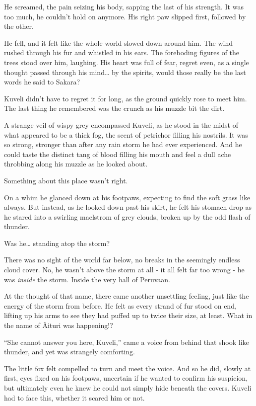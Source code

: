 He screamed, the pain seizing his body, sapping the last of his strength. It was too much, he couldn't hold on anymore. His right paw slipped first, followed by the other.

He fell, and it felt like the whole world slowed down around him. The wind rushed through his fur and whistled in his ears. The foreboding figures of the trees stood over him, laughing. His heart was full of fear, regret even, as a single thought passed through his mind\ldots{} by the spirits, would those really be the last words he said to Sakara?

Kuveli didn't have to regret it for long, as the ground quickly rose to meet him. The last thing he remembered was the crunch as his muzzle bit the dirt.

\secdiv

\noindent A strange veil of wispy grey encompassed Kuveli, as he stood in the midst of what appeared to be a thick fog, the scent of petrichor filling his nostrils. It was so strong, stronger than after any rain storm he had ever experienced. And he could taste the distinct tang of blood filling his mouth and feel a dull ache throbbing along his muzzle as he looked about.

Something about this place wasn't right.

On a whim he glanced down at his footpaws, expecting to find the soft grass like always. But instead, as he looked down past his skirt, he felt his stomach drop as he stared into a swirling maelstrom of grey clouds, broken up by the odd flash of thunder.

Was he\ldots{} standing atop the storm?

There was no sight of the world far below, no breaks in the seemingly endless cloud cover. No, he wasn't above the storm at all - it all felt far too wrong - he was \emph{inside} the storm. Inside the very hall of Peruvaan.

At the thought of that name, there came another unsettling feeling, just like the energy of the storm from before. He felt as every strand of fur stood on end, lifting up his arms to see they had puffed up to twice their size, at least. What in the name of Äituri was happening!?

``She cannot answer you here, Kuveli,'' came a voice from behind that shook like thunder, and yet was strangely comforting.

The little fox felt compelled to turn and meet the voice. And so he did, slowly at first, eyes fixed on his footpaws, uncertain if he wanted to confirm his suspicion, but ultimately even he knew he could not simply hide beneath the covers. Kuveli had to face this, whether it scared him or not.

